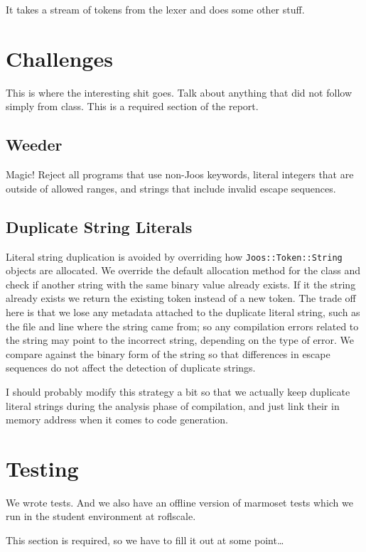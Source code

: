 \documentclass[pdftex,11pt,a4paper]{article}
\begin{document}
It takes a stream of tokens from the lexer and does some other stuff.


\section{Challenges}


This is where the interesting shit goes. Talk about anything that did
not follow simply from class. This is a required section of the report.


\subsection{Weeder}

Magic! Reject all programs that use non-Joos keywords, literal
integers that are outside of allowed ranges, and strings that include
invalid escape sequences.


\subsection{Duplicate String Literals}

Literal string duplication is avoided by overriding how
\texttt{Joos::Token::String} objects are allocated. We override the
default allocation method for the class and check if another string
with the same binary value already exists. If it the string already
exists we return the existing token instead of a new token. The trade
off here is that we lose any metadata attached to the duplicate
literal string, such as the file and line where the string came from;
so any compilation errors related to the string may point to the
incorrect string, depending on the type of error. We compare against
the binary form of the string so that differences in escape sequences
do not affect the detection of duplicate strings.

I should probably modify this strategy a bit so that we actually keep
duplicate literal strings during the analysis phase of compilation,
and just link their in memory address when it comes to code
generation.


\section{Testing}

We wrote tests. And we also have an offline version of marmoset tests
which we run in the student environment at roflscale.

This section is required, so we have to fill it out at some point\ldots
\end{document}

